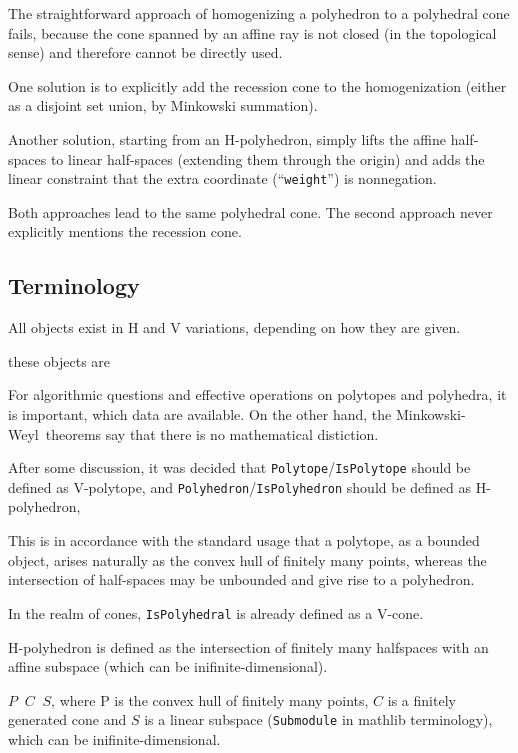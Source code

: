 \documentclass[a4paper,11pt]{article}
\newcommand\lean{\texttt}
\newcommand\MW{Minkowski-Weyl}
\begin{document}
The straightforward approach of homogenizing a polyhedron to a
polyhedral cone fails, because the cone spanned by an affine ray is not
closed (in the topological sense) and therefore cannot be directly used.

One solution is to explicitly add the recession cone to the
homogenization
(either as a disjoint set union, by Minkowski summation).

Another solution, starting from an H-polyhedron, simply lifts the
affine half-spaces to linear half-spaces (extending them through the
origin) and
adds the linear constraint that the extra coordinate
(``\lean{weight}'') is nonnegation.

Both approaches lead to the same polyhedral cone.
The second approach
never explicitly mentions the recession cone.


\subsection{Terminology}
\label{sec:terminology}

All objects exist in H and V variations, depending on how they are
given.

these objects are

For algorithmic questions and effective operations on polytopes and
polyhedra, it is important, which data are available.
On the other hand,
the \MW\ theorems say that there is no mathematical distiction.

After some discussion, it was decided
that \lean{Polytope}/\lean{IsPolytope} should be defined as V-polytope,
and \lean{Polyhedron}/\lean{IsPolyhedron} should be defined as
H-polyhedron,

This is
in accordance with the standard usage that a polytope, as a bounded object,
arises naturally as the convex hull of finitely many points, %
whereas the intersection of half-spaces may be unbounded and give rise to
 a polyhedron.

In the realm of cones,
\lean{IsPolyhedral} is already defined as a V-cone.

H-polyhedron is defined as the
intersection of finitely many halfspaces with an affine subspace
(which can be inifinite-dimensional).

$P
\mathop{+_\mathrm{a}}
C \mathop{+_\mathrm{v}}
S
$, where P is the convex hull of finitely many points,
$C$ is a finitely generated cone
and $S$ is a linear subspace (\lean{Submodule} in mathlib
terminology),
which can be inifinite-dimensional.
\end{document}
